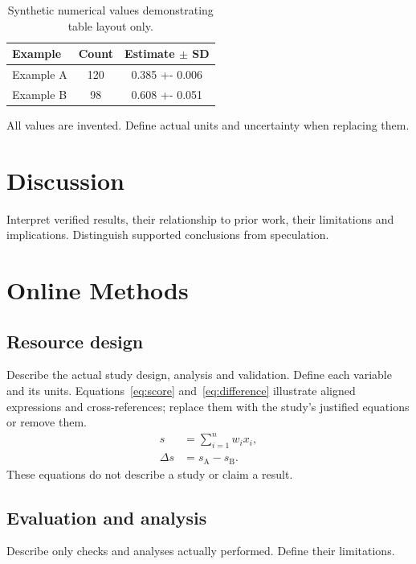 \documentclass[11pt]{article}
\begin{document}
\begin{table}[htbp]
\centering\small
\caption{Synthetic numerical values demonstrating table layout only.}
\label{tab:comparison}
\begin{tabularx}{\linewidth}{@{}>{\raggedright\arraybackslash}X
 S[table-format=3.0] S[table-format=1.3(3)]@{}}
\toprule
Example & {Count} & {Estimate $\pm$ SD}\\
\midrule
Example A & 120 & 0.385 +- 0.006\\
Example B & 98 & 0.608 +- 0.051\\
\bottomrule
\end{tabularx}
\par\smallskip\footnotesize\raggedright
All values are invented. Define actual units and uncertainty when replacing them.
\end{table}

\section{Discussion}\label{sec:discussion}
Interpret verified results, their relationship to prior work, their limitations
and implications. Distinguish supported conclusions from speculation.

\section{Online Methods}\label{sec:methods}
\subsection{Resource design}
Describe the actual study design, analysis and validation. Define each variable and its units. Equations~\eqref{eq:score}
and~\eqref{eq:difference} illustrate aligned expressions and cross-references;
replace them with the study's justified equations or remove them.
\begin{align}
 s &= \sum_{i=1}^{n} w_i x_i,\label{eq:score}\\
 \Delta s &= s_{\mathrm{A}}-s_{\mathrm{B}}.\label{eq:difference}
\end{align}
These equations do not describe a study or claim a result.

\subsection{Evaluation and analysis}
Describe only checks and analyses actually performed. Define their limitations.
\end{document}
